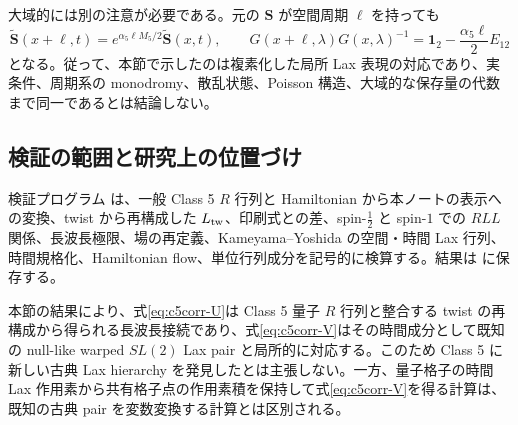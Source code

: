 大域的には別の注意が必要である。元の $\boldsymbol S$ が空間周期 $\ell$ を持っても
\begin{equation}
\widetilde{\boldsymbol S}(x+\ell,t)
=e^{\alpha_5\ell M_5/2}\widetilde{\boldsymbol S}(x,t),
\qquad
G(x+\ell,\lambda)G(x,\lambda)^{-1}
=\mathbf1_2-\frac{\alpha_5\ell}{2}E_{12}
\end{equation}
となる。従って、本節で示したのは複素化した局所 Lax 表現の対応であり、実条件、周期系の monodromy、散乱状態、Poisson 構造、大域的な保存量の代数まで同一であるとは結論しない。

\subsection{検証の範囲と研究上の位置づけ}

検証プログラム  は、一般 Class 5 $R$ 行列と Hamiltonian から本ノートの表示への変換、twist から再構成した $L_{\rm tw}$、印刷式との差、spin-$\tfrac12$ と spin-$1$ での $RLL$ 関係、長波長極限、場の再定義、Kameyama--Yoshida の空間・時間 Lax 行列、時間規格化、Hamiltonian flow、単位行列成分を記号的に検算する。結果は  に保存する。

本節の結果により、式\eqref{eq:c5corr-U}は Class 5 量子 $R$ 行列と整合する twist の再構成から得られる長波長接続であり、式\eqref{eq:c5corr-V}はその時間成分として既知の null-like warped $SL(2)$ Lax pair と局所的に対応する。このため Class 5 に新しい古典 Lax hierarchy を発見したとは主張しない。一方、量子格子の時間 Lax 作用素から共有格子点の作用素積を保持して式\eqref{eq:c5corr-V}を得る計算は、既知の古典 pair を変数変換する計算とは区別される。
